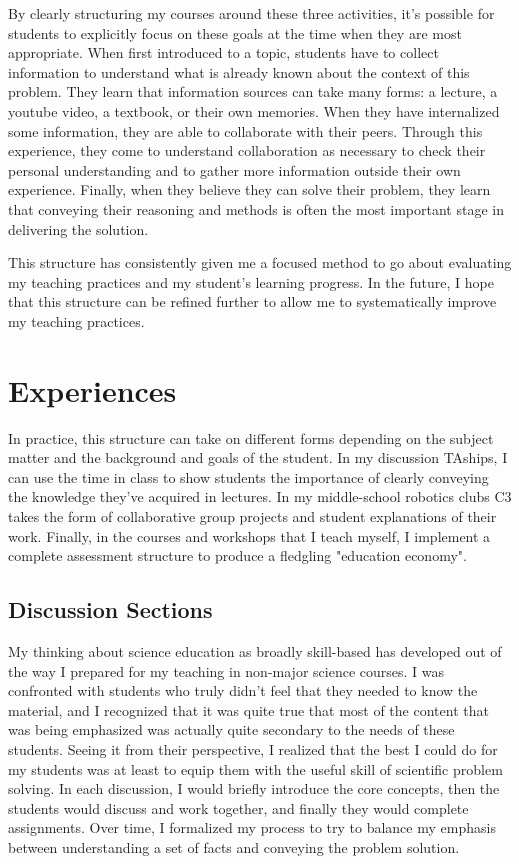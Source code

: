 \documentclass[12pt]{amsart} \usepackage{amssymb}
\begin{document}
By clearly structuring my courses around these three activities, it's possible for students to explicitly focus on these goals at the time when they are most appropriate.  When first introduced to a topic, students have to collect information to understand what is already known about the context of this problem. They learn that information sources can take many forms: a lecture, a youtube video, a textbook, or their own memories.  When they have internalized some information, they are able to collaborate with their peers. Through this experience, they come to understand collaboration as necessary to check their personal understanding and to gather more information outside their own experience.  Finally, when they believe they can solve their problem, they learn that conveying their reasoning and methods is often the most important stage in delivering the solution.  

This structure has consistently given me a focused method to go about evaluating my teaching practices and my student's learning progress.  In the future, I hope that this structure can be refined further to allow me to systematically improve my teaching practices.

\section*{Experiences}
In practice, this structure can take on different forms depending on the subject matter and the background and goals of the student. In my discussion TAships, I can use the time in class to show students the importance of clearly conveying the knowledge they've acquired in lectures.   In my middle-school robotics clubs C3 takes the form of collaborative group projects and student explanations of their work.  Finally, in the courses and workshops that I teach myself, I implement a complete assessment structure to produce a fledgling "education economy".   
\subsection*{Discussion Sections}
My thinking about science education as broadly skill-based has developed out of the way I prepared for my teaching in non-major science courses. I was confronted with students who truly didn't feel that they needed to know the material, and I recognized that it was quite true that most of the content that was being emphasized was actually quite secondary to the needs of these students. Seeing it from their perspective, I realized that the best I could do for my students was at least to equip them with the useful skill of scientific problem solving.  In each discussion, I would briefly introduce the core concepts, then the students would discuss and work together, and finally they would complete assignments.  Over time, I formalized my process to try to balance my emphasis between understanding a set of facts and conveying the problem solution.
\end{document}
